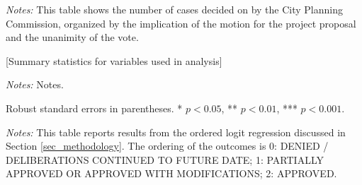 \documentclass[12pt,english,hyperfootnotes=false,hidelinks]{article}
\begin{document}
\begin{table}[H]
\caption{Summary of Motion Outcomes and Vote Results}
\vspace{0.2cm}
\label{tab_result_unanimity}
\begin{adjustbox}{max width=\textwidth}
\begin{threeparttable}

\begin{tablenotes}

\item {\textit{Notes: } This table shows the number of cases decided on by the City Planning Commission, organized by the implication of the motion for the project proposal and the unanimity of the vote.}
\end{tablenotes}
\end{threeparttable}
\end{adjustbox}
\end{table}

\pagebreak

\begin{table}[H]
\caption{Summary Statistics for Case Features}
\vspace{0.2cm}
\label{tab_summary_stats}
\begin{adjustbox}{max width=\textwidth}
\begin{threeparttable}
\begin{center}
[Summary statistics for variables used in analysis]
\end{center}
\begin{tablenotes}
\item {\textit{Notes: } Notes.}
\end{tablenotes}
\end{threeparttable}
\end{adjustbox}
\end{table}

\pagebreak

\begin{table}[H]
  \caption{Ordered Logit Regression Results}
  \vspace{0.2cm}
  \label{tab_ologit_results}
  \begin{adjustbox}{max width=\textwidth}
    \begin{threeparttable}
      \centering
      
        \begin{tablenotes}[flushleft]
        \footnotesize
        \item Robust standard errors in parentheses. * $p<0.05$, ** $p<0.01$, *** $p<0.001$.
        \item \textit{Notes:} This table reports results from the ordered logit regression 
        discussed in Section \ref{sec_methodology}. The ordering of the outcomes is 
        0: DENIED / DELIBERATIONS CONTINUED TO FUTURE DATE; 
        1: PARTIALLY APPROVED OR APPROVED WITH MODIFICATIONS; 
        2: APPROVED.
      \end{tablenotes}
    \end{threeparttable}
  \end{adjustbox}
\end{table}
\end{document}
